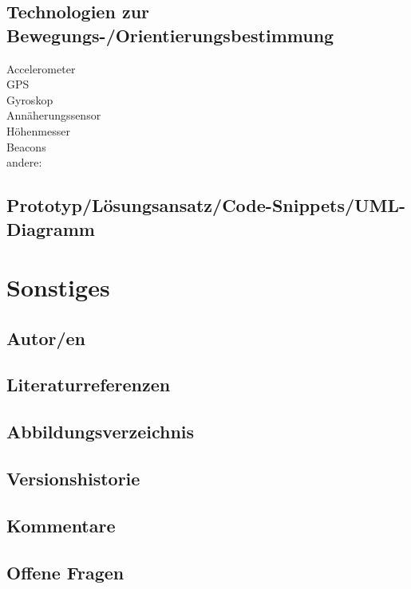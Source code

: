 \technologyCommunicationDesc

\subsection*{Technologien zur Bewegungs-/Orientierungsbestimmung}
\checkbox{\technologyOrientationAccelerometer} Accelerometer \\
\checkbox{\technologyOrientationGPS} GPS \\
\checkbox{\technologyOrientationGyroskop} Gyroskop \\
\checkbox{\technologyOrientationAnnaeherung} Annäherungssensor \\
\checkbox{\technologyOrientationHoehe} Höhenmesser \\
\checkbox{\technologyOrientationBeacons} Beacons \\
\checkbox{\technologyOrientationOther} andere: \\


\subsection*{Prototyp/Lösungsansatz/Code-Snippets/UML-Diagramm}
\prototype




\section*{Sonstiges}

\subsection*{Autor/en}
\authors

\subsection*{Literaturreferenzen}
\literature

\subsection*{Abbildungsverzeichnis}
\figures

\subsection*{Versionshistorie}
\versionhistory

\subsection*{Kommentare}
\comments

\subsection*{Offene Fragen}
\questions